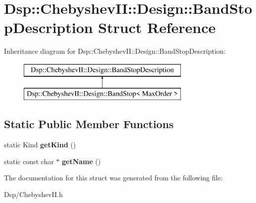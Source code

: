 \hypertarget{structDsp_1_1ChebyshevII_1_1Design_1_1BandStopDescription}{\section{Dsp\-:\-:Chebyshev\-I\-I\-:\-:Design\-:\-:Band\-Stop\-Description Struct Reference}
\label{structDsp_1_1ChebyshevII_1_1Design_1_1BandStopDescription}
}
Inheritance diagram for Dsp\-:\-:Chebyshev\-I\-I\-:\-:Design\-:\-:Band\-Stop\-Description\-:\begin{figure}[H]
\begin{center}
\leavevmode
\includegraphics[height=2.000000cm]{structDsp_1_1ChebyshevII_1_1Design_1_1BandStopDescription}
\end{center}
\end{figure}
\subsection*{Static Public Member Functions}
\begin{DoxyCompactItemize}
\item 
\hypertarget{structDsp_1_1ChebyshevII_1_1Design_1_1BandStopDescription_a7a848e6a13cf31d4aa0c44715d813be4}{static Kind {\bfseries get\-Kind} ()}\label{structDsp_1_1ChebyshevII_1_1Design_1_1BandStopDescription_a7a848e6a13cf31d4aa0c44715d813be4}

\item 
\hypertarget{structDsp_1_1ChebyshevII_1_1Design_1_1BandStopDescription_aba7ef258b826a4aaedda528732764457}{static const char $\ast$ {\bfseries get\-Name} ()}\label{structDsp_1_1ChebyshevII_1_1Design_1_1BandStopDescription_aba7ef258b826a4aaedda528732764457}

\end{DoxyCompactItemize}


The documentation for this struct was generated from the following file\-:\begin{DoxyCompactItemize}
\item 
Dsp/Chebyshev\-I\-I.\-h\end{DoxyCompactItemize}
